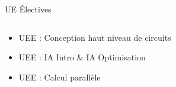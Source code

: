 \documentclass[t,compress,mathserif,12pt,xcolor=dvipsnames]{beamer}
\begin{document}
\begin{frame}[t]{UE \'Electives}
  \begin{minipage}[t][5.0cm][t]{\textwidth}
    \begin{columns}[T]
      \begin{column}{0.63\textwidth}
        \begin{itemize}
            \item<+-> UEE : Conception haut niveau de circuits
            \item<+-> UEE : IA Intro \& IA Optimisation
            \item<+-> UEE : Calcul parallèle
        \end{itemize}
      \end{column}
      \begin{column}{0.04\textwidth}


\end{column}
\end{columns}
\end{minipage}
\end{frame}
\end{document}
